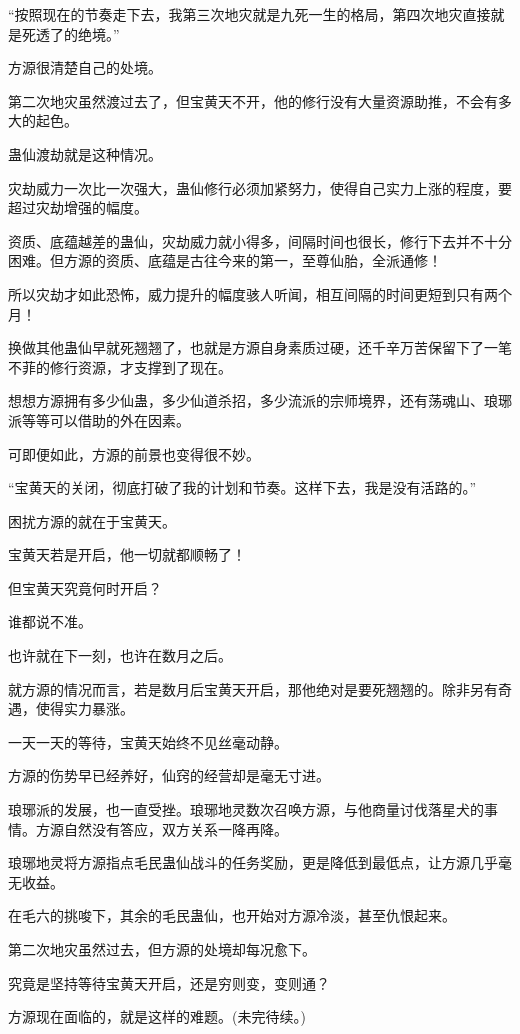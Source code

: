 \begin{this_body}
“按照现在的节奏走下去，我第三次地灾就是九死一生的格局，第四次地灾直接就是死透了的绝境。”

方源很清楚自己的处境。

第二次地灾虽然渡过去了，但宝黄天不开，他的修行没有大量资源助推，不会有多大的起色。

蛊仙渡劫就是这种情况。

灾劫威力一次比一次强大，蛊仙修行必须加紧努力，使得自己实力上涨的程度，要超过灾劫增强的幅度。

资质、底蕴越差的蛊仙，灾劫威力就小得多，间隔时间也很长，修行下去并不十分困难。但方源的资质、底蕴是古往今来的第一，至尊仙胎，全派通修！

所以灾劫才如此恐怖，威力提升的幅度骇人听闻，相互间隔的时间更短到只有两个月！

换做其他蛊仙早就死翘翘了，也就是方源自身素质过硬，还千辛万苦保留下了一笔不菲的修行资源，才支撑到了现在。

想想方源拥有多少仙蛊，多少仙道杀招，多少流派的宗师境界，还有荡魂山、琅琊派等等可以借助的外在因素。

可即便如此，方源的前景也变得很不妙。

“宝黄天的关闭，彻底打破了我的计划和节奏。这样下去，我是没有活路的。”

困扰方源的就在于宝黄天。

宝黄天若是开启，他一切就都顺畅了！

但宝黄天究竟何时开启？

谁都说不准。

也许就在下一刻，也许在数月之后。

就方源的情况而言，若是数月后宝黄天开启，那他绝对是要死翘翘的。除非另有奇遇，使得实力暴涨。

一天一天的等待，宝黄天始终不见丝毫动静。

方源的伤势早已经养好，仙窍的经营却是毫无寸进。

琅琊派的发展，也一直受挫。琅琊地灵数次召唤方源，与他商量讨伐落星犬的事情。方源自然没有答应，双方关系一降再降。

琅琊地灵将方源指点毛民蛊仙战斗的任务奖励，更是降低到最低点，让方源几乎毫无收益。

在毛六的挑唆下，其余的毛民蛊仙，也开始对方源冷淡，甚至仇恨起来。

第二次地灾虽然过去，但方源的处境却每况愈下。

究竟是坚持等待宝黄天开启，还是穷则变，变则通？

方源现在面临的，就是这样的难题。(未完待续。)

\end{this_body}

